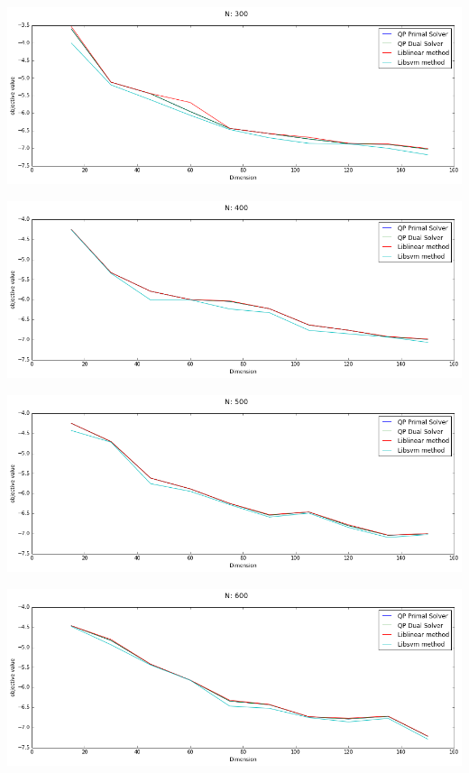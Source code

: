 \documentclass[12pt, a4paper]{article}
\begin{document}
			\begin{center}
				\includegraphics[width=17cm]{1par_obj_N300_one.png}
			\end{center}

			\begin{center}
				\includegraphics[width=17cm]{1par_obj_N400_one.png}
			\end{center}

			\begin{center}
				\includegraphics[width=17cm]{1par_obj_N500_one.png}
			\end{center}

			\begin{center}
				\includegraphics[width=17cm]{1par_obj_N600_one.png}
			\end{center}
\end{document}
